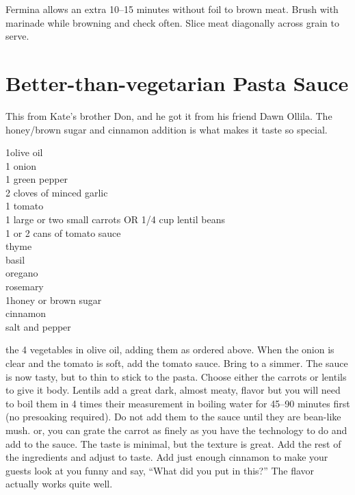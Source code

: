 Fermina allows an extra \numrange{10}{15} minutes without foil to brown meat.
Brush with marinade while browning and check often.  Slice meat diagonally
across grain to serve.

\section{Better-than-vegetarian Pasta Sauce}

\begin{open}
  This from Kate's brother Don, and he got it from his friend Dawn
  Ollila. The honey/brown sugar and cinnamon addition is what makes it taste
  so special.
\end{open}
\begin{ingredients}
  \SI{1}{\tblspoon}olive oil \\
  1 onion \\
  1 green pepper \\
  2 cloves of minced garlic \\
  1 tomato\\
  1 large or two small carrots OR \SI{1/4}{\cup} cup lentil beans \\
  1 or 2 cans of tomato sauce \\
  thyme \\
  basil \\
  oregano \\
  rosemary \\
  \SI{1}{\tblspoon}honey or brown sugar \\
  cinnamon \\
  salt and pepper
\end{ingredients}
\Saute the 4 vegetables in olive oil, adding them as ordered above. When the
onion is clear and the tomato is soft, add the tomato sauce.  Bring to a
simmer. The sauce is now tasty, but to thin to stick to the pasta.  Choose
either the carrots or lentils to give it body. Lentils add a great dark,
almost meaty, flavor but you will need to boil them in 4 times their
measurement in boiling water for \numrange{45}{90} minutes first
(no presoaking required). Do not add them to the sauce until they are
bean-like mush. or, you can grate the carrot as finely as you have the
technology to do and add to the sauce. The taste is minimal, but the texture
is great. Add the rest of the ingredients and adjust to taste. Add just enough
cinnamon to make your guests look at you funny and say, ``What did you put in
this?'' The flavor actually works quite well.

